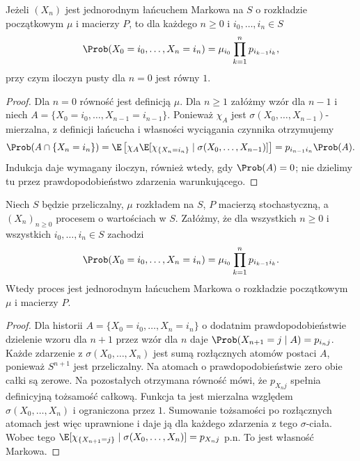 \begin{twierdzenie}
\label{thm:rp1-12-path-law}
Jeżeli $(X_n)$ jest jednorodnym łańcuchem Markowa
na $S$ o rozkładzie początkowym $\mu$ i macierzy $P$,
to dla każdego $n\geq0$ i $i_0,\ldots,i_n\in S$
\[
\Prob(X_0=i_0,\ldots,X_n=i_n)
=\mu_{i_0}\prod_{k=1}^n p_{i_{k-1}i_k},
\]
przy czym iloczyn pusty dla $n=0$ jest równy $1$.
\end{twierdzenie}
\begin{proof}
Dla $n=0$ równość jest definicją $\mu$.
Dla $n\geq1$ załóżmy wzór dla $n-1$ i niech
$A=\{X_0=i_0,\ldots,X_{n-1}=i_{n-1}\}$.
Ponieważ $\chi_{A}$ jest $\sigma(X_0,\ldots,X_{n-1})$-
mierzalna, z definicji łańcucha i własności
wyciągania czynnika otrzymujemy
\[
\Prob(A\cap\{X_n=i_n\})
=\E\left[\chi_{A}\E[\chi_{\{X_n=i_n\}}
\mid\sigma(X_0,\ldots,X_{n-1})]\right]
=p_{i_{n-1}i_n}\Prob(A).
\]
Indukcja daje wymagany iloczyn, również wtedy,
gdy $\Prob(A)=0$; nie dzielimy tu przez
prawdopodobieństwo zdarzenia warunkującego.
\end{proof}


\begin{twierdzenie}
Niech $S$ będzie przeliczalny, $\mu$ rozkładem na $S$,
$P$ macierzą stochastyczną, a $(X_n)_{n\geq0}$ procesem
o wartościach w $S$. Załóżmy, że dla wszystkich $n\geq0$
i wszystkich $i_0,\ldots,i_n\in S$ zachodzi
\[
\Prob(X_0=i_0,\ldots,X_n=i_n)
=\mu_{i_0}\prod_{k=1}^np_{i_{k-1}i_k}.
\]
Wtedy proces jest jednorodnym łańcuchem Markowa
o rozkładzie początkowym $\mu$ i macierzy $P$.
\end{twierdzenie}
\begin{proof}
Dla historii $A=\{X_0=i_0,\ldots,X_n=i_n\}$
o dodatnim prawdopodobieństwie dzielenie wzoru
dla $n+1$ przez wzór dla $n$ daje
$\Prob(X_{n+1}=j\mid A)=p_{i_nj}$.
Każde zdarzenie z $\sigma(X_0,\ldots,X_n)$
jest sumą rozłącznych atomów postaci $A$,
ponieważ $S^{n+1}$ jest przeliczalny.
Na atomach o prawdopodobieństwie zero obie całki
są zerowe. Na pozostałych otrzymana równość mówi,
że $p_{X_nj}$ spełnia definicyjną tożsamość całkową.
Funkcja ta jest mierzalna względem
$\sigma(X_0,\ldots,X_n)$ i ograniczona przez $1$.
Sumowanie tożsamości po rozłącznych atomach
jest więc uprawnione i daje ją dla każdego zdarzenia
z tego $\sigma$-ciała.
Wobec tego
$\E[\chi_{\{X_{n+1}=j\}}\mid
\sigma(X_0,\ldots,X_n)]=p_{X_nj}$ p.n.
To jest własność Markowa.
\end{proof}

